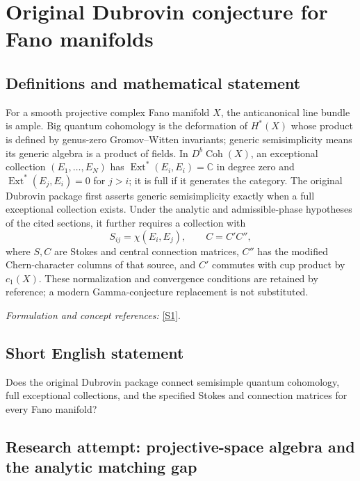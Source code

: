 \documentclass[11pt]{article}
\begin{document}
\section*{\texorpdfstring{Original Dubrovin conjecture for Fano manifolds}{Original Dubrovin conjecture for Fano manifolds}}\label{30006855}
\subsection{Definitions and mathematical statement}
For a smooth projective complex Fano manifold $X$, the anticanonical line bundle is ample. Big quantum cohomology is the deformation of $H^*(X)$ whose product is defined by genus-zero Gromov--Witten invariants; generic semisimplicity means its generic algebra is a product of fields. In $D^b\operatorname{Coh}(X)$, an exceptional collection $(E_1,\ldots,E_N)$ has $\operatorname{Ext}^*(E_i,E_i)={\mathbb{C}}$ in degree zero and $\operatorname{Ext}^*(E_j,E_i)=0$ for $j>i$; it is full if it generates the category. The original Dubrovin package first asserts generic semisimplicity exactly when a full exceptional collection exists. Under the analytic and admissible-phase hypotheses of the cited sections, it further requires a collection with
\[
 S_{ij}=\chi(E_i,E_j),\qquad C=C'C'',
\]
where $S,C$ are Stokes and central connection matrices, $C''$ has the modified Chern-character columns of that source, and $C'$ commutes with cup product by $c_1(X)$. These normalization and convergence conditions are retained by reference; a modern Gamma-conjecture replacement is not substituted.
\par\smallskip\textit{Formulation and concept references:} \href{https://arxiv.org/pdf/1404.6407v4}{[S1]}.

\subsection{Short English statement}
Does the original Dubrovin package connect semisimple quantum cohomology, full exceptional collections, and the specified Stokes and connection matrices for every Fano manifold?
\subsection{Research attempt: projective-space algebra and the analytic matching gap}
\end{document}

